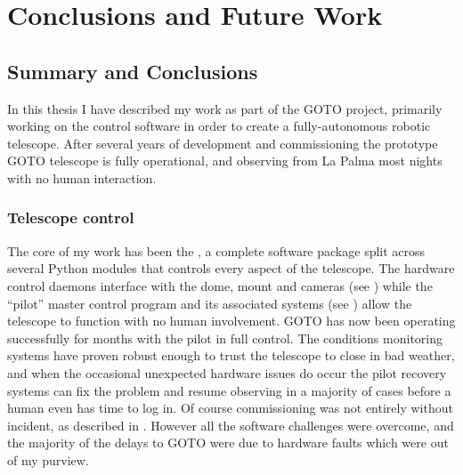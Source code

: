 \chapter{Conclusions and Future Work}
\label{chap:conclusion}
\chaptoc{}


\newpage
\section{Summary and Conclusions}
\label{sec:conclusion}
\begin{colsection}


\begin{colsection}

In this thesis I have described my work as part of the GOTO project, primarily working on the control software in order to create a fully-autonomous robotic telescope. After several years of development and commissioning the prototype GOTO telescope is fully operational, and observing from La Palma most nights with no human interaction.

\end{colsection}


\subsection{Telescope control}
\label{sec:control_results}
\begin{colsection}

The core of my work has been the , a complete software package split across several Python modules that controls every aspect of the telescope. The hardware control daemons interface with the dome, mount and cameras (see ) while the ``pilot'' master control program and its associated systems (see ) allow the telescope to function with no human involvement. GOTO has now been operating successfully for months with the pilot in full control. The conditions monitoring systems have proven robust enough to trust the telescope to close in bad weather, and when the occasional unexpected hardware issues do occur the pilot recovery systems can fix the problem and resume observing in a majority of cases before a human even has time to log in. Of course commissioning was not entirely without incident, as described in . However all the software challenges were overcome, and the majority of the delays to GOTO were due to hardware faults which were out of my purview.


\end{colsection}
\end{colsection}
